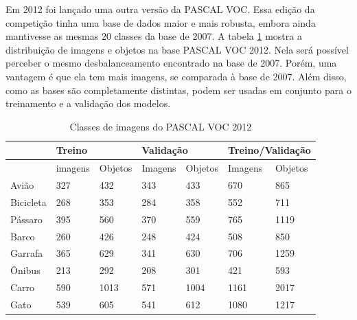 Em 2012 foi lançado uma outra versão da \ac{PASCAL VOC}. Essa edição da competição tinha uma base de dados maior e mais robusta, embora ainda mantivesse as mesmas 20 classes da base de 2007. A tabela \ref{tab:voc2012} mostra a distribuição de imagens e objetos na base \ac{PASCAL VOC} 2012. Nela será possível perceber o mesmo desbalanceamento encontrado na base de 2007. Porém, uma vantagem é que ela tem mais imagens, se comparada à base de 2007. Além disso, como as bases são completamente distintas, podem ser usadas em conjunto para o treinamento e a validação dos modelos.

\begin{table}[H]
	\centering
	\footnotesize
	\setlength{\abovecaptionskip}{0pt}
	\setlength{\belowcaptionskip}{0pt}
	\caption[Pascal VOC 2012]{Classes de imagens do PASCAL VOC 2012}
	\label{tab:voc2012}
	\begin{tabular}{l|l|l|l|l|l|l}
		& \multicolumn{2}{l|}{Treino} & \multicolumn{2}{l|}{Validação} & \multicolumn{2}{l}{Treino/Validação} \\ \hline
		& imagens      & Objetos      & Imagens        & Objetos       & Imagens           & Objetos           \\ \hline
		Avião          & 327          & 432          & 343            & 433           & 670               & 865               \\
		Bicicleta      & 268          & 353          & 284            & 358           & 552               & 711               \\
		Pássaro        & 395          & 560          & 370            & 559           & 765               & 1119              \\
		Barco          & 260          & 426          & 248            & 424           & 508               & 850               \\
		Garrafa        & 365          & 629          & 341            & 630           & 706               & 1259              \\
		Ônibus         & 213          & 292          & 208            & 301           & 421               & 593               \\
		Carro          & 590          & 1013         & 571            & 1004          & 1161              & 2017              \\
		Gato           & 539          & 605          & 541            & 612           & 1080              & 1217              \\

\end{tabular}
\end{table}
